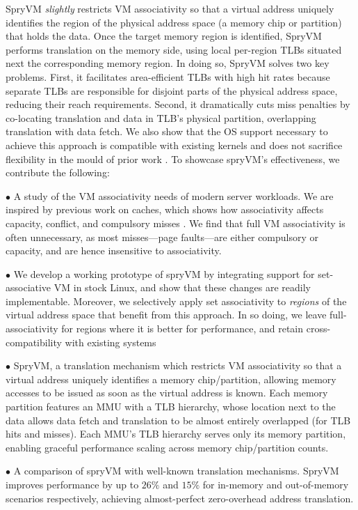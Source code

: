 SpryVM {\it slightly} restricts VM associativity so that a virtual
address uniquely identifies the region of the physical address space
(a memory chip or partition) that holds the data. Once the target
memory region is identified, SpryVM performs translation on the memory
side, using local per-region TLBs situated next the corresponding
memory region.  In doing so, SpryVM solves two key problems. First, it
facilitates area-efficient TLBs with high hit rates because separate
TLBs are responsible for disjoint parts of the physical address space,
reducing their reach requirements. Second, it dramatically cuts miss
penalties by co-locating translation and data in TLB's physical
partition, overlapping translation with data fetch. We also show that
the OS support necessary to achieve this approach is compatible with
existing kernels and does not sacrifice flexibility in the mould of
prior work \cite{basu:efficient, haria:devirtualizing}. To showcase
spryVM's effectiveness, we contribute the following:

\noindent $\bullet$ A study of the VM associativity needs of modern
server workloads. We are inspired by previous work on caches, which
shows how associativity affects capacity, conflict, and compulsory
misses \cite{hill:case}. We find that full VM associativity is often
unnecessary, as most misses---page faults---are either compulsory or
capacity, and are hence insensitive to associativity. 

\noindent $\bullet$ We develop a working prototype of spryVM by
integrating support for set-associative VM in stock Linux, and show
that these changes are readily implementable. Moreover, we selectively
apply set associativity to {\it regions} of the virtual address space
that benefit from this approach. In so doing, we leave
full-associativity for regions where it is better for performance, and
retain cross-compatibility with existing systems 

\noindent $\bullet$ SpryVM, a translation mechanism which restricts VM
associativity so that a virtual address uniquely identifies a memory
chip/partition, allowing memory accesses to be issued as soon as the
virtual address is known. Each memory partition features an MMU with a
TLB hierarchy, whose location next to the data allows data fetch and
translation to be almost entirely overlapped (for TLB hits and
misses). Each MMU's TLB hierarchy serves only its memory partition,
enabling graceful performance scaling across memory chip/partition
counts.

\noindent $\bullet$ A comparison of spryVM with well-known translation
mechanisms. SpryVM improves performance by up to $26\%$ and $15\%$ for
in-memory and out-of-memory scenarios respectively, achieving
almost-perfect zero-overhead address translation.
